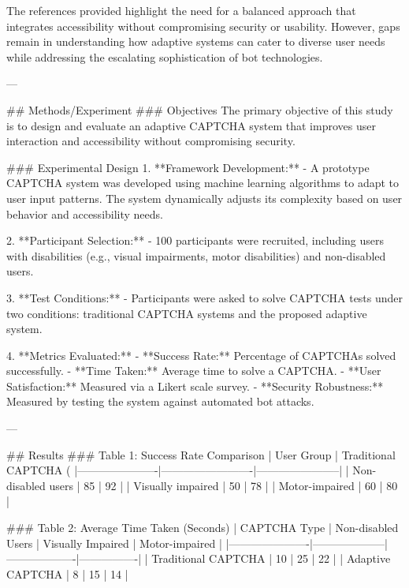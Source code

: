 The references provided highlight the need for a balanced approach that integrates accessibility without compromising security or usability. However, gaps remain in understanding how adaptive systems can cater to diverse user needs while addressing the escalating sophistication of bot technologies.

---

## Methods/Experiment
### Objectives
The primary objective of this study is to design and evaluate an adaptive CAPTCHA system that improves user interaction and accessibility without compromising security.

### Experimental Design
1. **Framework Development:** 
   - A prototype CAPTCHA system was developed using machine learning algorithms to adapt to user input patterns. The system dynamically adjusts its complexity based on user behavior and accessibility needs.
   
2. **Participant Selection:**
   - 100 participants were recruited, including users with disabilities (e.g., visual impairments, motor disabilities) and non-disabled users.
   
3. **Test Conditions:**
   - Participants were asked to solve CAPTCHA tests under two conditions: traditional CAPTCHA systems and the proposed adaptive system.
   
4. **Metrics Evaluated:**
   - **Success Rate:** Percentage of CAPTCHAs solved successfully.
   - **Time Taken:** Average time to solve a CAPTCHA.
   - **User Satisfaction:** Measured via a Likert scale survey.
   - **Security Robustness:** Measured by testing the system against automated bot attacks.

---

## Results
### Table 1: Success Rate Comparison
| User Group           | Traditional CAPTCHA (%
|----------------------|-------------------------|-----------------------|
| Non-disabled users   | 85                     | 92                   |
| Visually impaired    | 50                     | 78                   |
| Motor-impaired       | 60                     | 80                   |

### Table 2: Average Time Taken (Seconds)
| CAPTCHA Type         | Non-disabled Users | Visually Impaired | Motor-impaired |
|----------------------|--------------------|-------------------|----------------|
| Traditional CAPTCHA | 10                 | 25                | 22             |
| Adaptive CAPTCHA    | 8                  | 15                | 14             |

